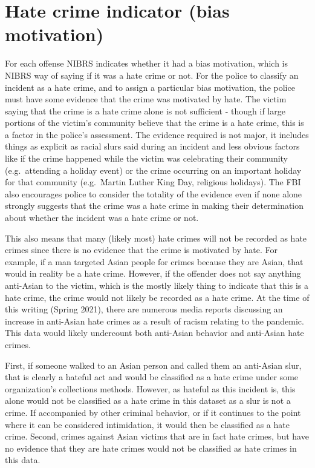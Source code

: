 \documentclass[
]{krantz}
\begin{document}
\section{Hate crime indicator (bias
motivation)}\label{hate-crime-indicator-bias-motivation}

For each offense NIBRS indicates whether it had a bias
motivation, which is NIBRS way of saying if it was a hate
crime or not. For the police to classify an incident as a
hate crime, and to assign a particular bias motivation, the
police must have some evidence that the crime was motivated
by hate. The victim saying that the crime is a hate crime
alone is not sufficient - though if large portions of the
victim's community believe that the crime is a hate crime,
this is a factor in the police's assessment. The evidence
required is not major, it includes things as explicit as
racial slurs said during an incident and less obvious
factors like if the crime happened while the victim was
celebrating their community (e.g.~attending a holiday event)
or the crime occurring on an important holiday for that
community (e.g.~Martin Luther King Day, religious holidays).
The FBI also encourages police to consider the totality of
the evidence even if none alone strongly suggests that the
crime was a hate crime in making their determination about
whether the incident was a hate crime or not.

This also means that many (likely most) hate crimes will not
be recorded as hate crimes since there is no evidence that
the crime is motivated by hate. For example, if a man
targeted Asian people for crimes because they are Asian,
that would in reality be a hate crime. However, if the
offender does not say anything anti-Asian to the victim,
which is the mostly likely thing to indicate that this is a
hate crime, the crime would not likely be recorded as a hate
crime. At the time of this writing (Spring 2021), there are
numerous media reports discussing an increase in anti-Asian
hate crimes as a result of racism relating to the pandemic.
This data would likely undercount both anti-Asian behavior
and anti-Asian hate crimes.

First, if someone walked to an Asian person and called them
an anti-Asian slur, that is clearly a hateful act and would
be classified as a hate crime under some organization's
collections methods. However, as hateful as this incident
is, this alone would not be classified as a hate crime in
this dataset as a slur is not a crime. If accompanied by
other criminal behavior, or if it continues to the point
where it can be considered intimidation, it would then be
classified as a hate crime. Second, crimes against Asian
victims that are in fact hate crimes, but have no evidence
that they are hate crimes would not be classified as hate
crimes in this data.
\end{document}
